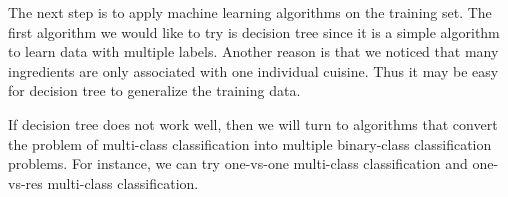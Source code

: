 \documentclass[11pt]{article}
\begin{document}
The next step is to apply machine learning algorithms on the training set. The first algorithm we would like to try is decision tree since it is a simple algorithm to learn data with multiple labels. Another reason is that we noticed that many ingredients are only associated with one individual cuisine. Thus it may be easy for decision tree to generalize the training data.

If decision tree does not work well, then we will turn to algorithms that convert the problem of multi-class classification into multiple binary-class classification problems. For instance, we can try one-vs-one multi-class classification\cite{wiki} and one-vs-res multi-class classification\cite{wiki}.  



\end{document}
